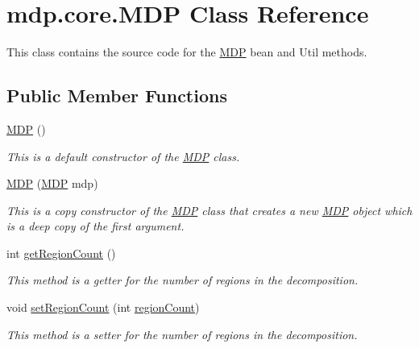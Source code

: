\hypertarget{classmdp_1_1core_1_1_m_d_p}{}\section{mdp.\+core.\+M\+D\+P Class Reference}
\label{classmdp_1_1core_1_1_m_d_p}


This class contains the source code for the \hyperlink{classmdp_1_1core_1_1_m_d_p}{M\+D\+P} bean and Util methods.  


\subsection*{Public Member Functions}
\begin{DoxyCompactItemize}
\item 
\hyperlink{classmdp_1_1core_1_1_m_d_p_af15e00532b218c521d8c7438766a60b0}{M\+D\+P} ()
\begin{DoxyCompactList}\small\item\em This is a default constructor of the \hyperlink{classmdp_1_1core_1_1_m_d_p}{M\+D\+P} class. \end{DoxyCompactList}\item 
\hyperlink{classmdp_1_1core_1_1_m_d_p_af11087e0e7e721fc8bc3d72ea8975827}{M\+D\+P} (\hyperlink{classmdp_1_1core_1_1_m_d_p}{M\+D\+P} mdp)
\begin{DoxyCompactList}\small\item\em This is a copy constructor of the \hyperlink{classmdp_1_1core_1_1_m_d_p}{M\+D\+P} class that creates a new \hyperlink{classmdp_1_1core_1_1_m_d_p}{M\+D\+P} object which is a deep copy of the first argument. \end{DoxyCompactList}\item 
int \hyperlink{classmdp_1_1core_1_1_m_d_p_a657abf1dbe9942a7fe521048884d1a6b}{get\+Region\+Count} ()
\begin{DoxyCompactList}\small\item\em This method is a getter for the number of regions in the decomposition. \end{DoxyCompactList}\item 
void \hyperlink{classmdp_1_1core_1_1_m_d_p_a83eac33ca62d6627b6a87a503428fd61}{set\+Region\+Count} (int \hyperlink{classmdp_1_1core_1_1_m_d_p_ae2644b9387e09a5c2ab096c0bb519f8d}{region\+Count})
\begin{DoxyCompactList}\small\item\em This method is a setter for the number of regions in the decomposition. \end{DoxyCompactList}\item 

\end{DoxyCompactItemize}
